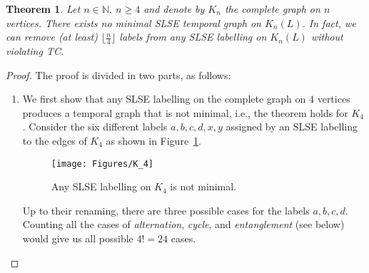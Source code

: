 \documentclass[a4paper,UKenglish]{article}
\newtheorem{theorem}{Theorem}
\begin{document}
\begin{theorem}\label{thm:clique_code}
Let $n\in \mathbb{N},~n\geq 4$ and denote by $K_n$ the complete graph on $n$ vertices. There exists \emph{no minimal} SLSE temporal graph on $K_n(L)$. In fact, we can remove (at least) $\lfloor \frac{n}{4} \rfloor$ labels from any SLSE labelling on $K_n(L)$ without violating TC.
\end{theorem}
\begin{proof}
The proof is divided in two parts, as follows:
\begin{enumerate}[label=(\alph*)]

\item\label{item:code_a} We first show that any SLSE labelling on the complete graph on $4$ vertices produces a temporal graph that is not minimal, i.e., the theorem holds for $K_4$. Consider the six different labels $a,b,c,d,x,y$ assigned by an SLSE labelling to the edges of $K_4$ as shown in Figure~\ref{fig:K_4}.

\begin{figure}[tbh!]
\centering
\texttt{[image: Figures/K\_4]}
\caption{Any SLSE labelling on $K_4$ is not minimal.}
\label{fig:K_4}
\end{figure}

Up to their renaming, there are three possible cases for the labels $a,b,c,d$. Counting all the cases of \emph{alternation}, \emph{cycle}, and \emph{entanglement} (see below) would give us all possible $4!=24$ cases.


\end{enumerate}
\end{proof}
\end{document}
